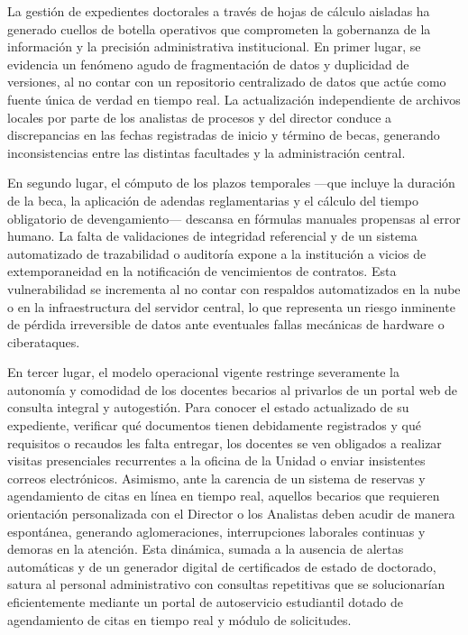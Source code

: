 La gestión de expedientes doctorales a través de hojas de cálculo aisladas ha generado cuellos de botella operativos que comprometen la gobernanza de la información y la precisión administrativa institucional. En primer lugar, se evidencia un fenómeno agudo de fragmentación de datos y duplicidad de versiones, al no contar con un repositorio centralizado de datos que actúe como fuente única de verdad en tiempo real. La actualización independiente de archivos locales por parte de los analistas de procesos y del director conduce a discrepancias en las fechas registradas de inicio y término de becas, generando inconsistencias entre las distintas facultades y la administración central.

En segundo lugar, el cómputo de los plazos temporales —que incluye la duración de la beca, la aplicación de adendas reglamentarias y el cálculo del tiempo obligatorio de devengamiento— descansa en fórmulas manuales propensas al error humano. La falta de validaciones de integridad referencial y de un sistema automatizado de trazabilidad o auditoría expone a la institución a vicios de extemporaneidad en la notificación de vencimientos de contratos. Esta vulnerabilidad se incrementa al no contar con respaldos automatizados en la nube o en la infraestructura del servidor central, lo que representa un riesgo inminente de pérdida irreversible de datos ante eventuales fallas mecánicas de hardware o ciberataques.

En tercer lugar, el modelo operacional vigente restringe severamente la autonomía y comodidad de los docentes becarios al privarlos de un portal web de consulta integral y autogestión. Para conocer el estado actualizado de su expediente, verificar qué documentos tienen debidamente registrados y qué requisitos o recaudos les falta entregar, los docentes se ven obligados a realizar visitas presenciales recurrentes a la oficina de la Unidad o enviar insistentes correos electrónicos. Asimismo, ante la carencia de un sistema de reservas y agendamiento de citas en línea en tiempo real, aquellos becarios que requieren orientación personalizada con el Director o los Analistas deben acudir de manera espontánea, generando aglomeraciones, interrupciones laborales continuas y demoras en la atención. Esta dinámica, sumada a la ausencia de alertas automáticas y de un generador digital de certificados de estado de doctorado, satura al personal administrativo con consultas repetitivas que se solucionarían eficientemente mediante un portal de autoservicio estudiantil dotado de agendamiento de citas en tiempo real y módulo de solicitudes.

